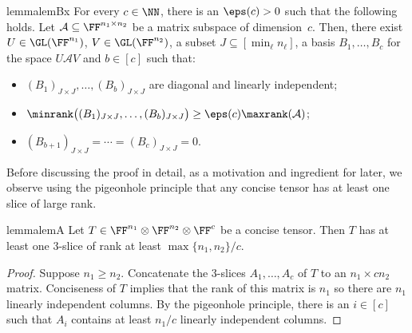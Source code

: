 \begin{restatable}{lemma}{lemBx}
\label{lem:minrk_diag}
\label{claim:matrices-into-diagonal-with-large-rank}
For every $c\in\NN$, there is an $\eps(c)>0$ such that the following holds.
Let $\mathcal A\subseteq \FF^{n_1\times n_2}$ be a matrix subspace of dimension~$c$.
Then, there exist $U\in \GL(\FF^{n_1})$, $V\in \GL(\FF^{n_2})$, a subset $J\subseteq [\min_\ell n_\ell]$, a basis $B_1,\dots,B_c$ for the space $U\mathcal AV$ and $b\in[c]$ such that:
\begin{itemize}
    \item $(B_1)_{J\times J},\dots,(B_b)_{J\times J}$  are diagonal and linearly independent;
    \item $\minrank\big((B_1)_{J\times J}, \ldots, (B_b)_{J\times J}\big) \geq \eps(c) \maxrank(\mathcal{A})$; %
    \item $(B_{b+1})_{J\times J} = \cdots = (B_c)_{J\times J} = 0$.
\end{itemize}
\end{restatable}


Before discussing the proof in detail, as a motivation and ingredient for later, we observe using the pigeonhole principle that any concise tensor has at least one slice of large rank. 

\begin{restatable}{lemma}{lemA}
%
\label{cla:high-rk}
Let $T\in\FF^{n_1}\otimes\FF^{n_2}\otimes\FF^{c}$ be a concise tensor. Then $T$ has at least one 3-slice 
of rank at least $\max\{n_1,n_2\}/c$.    
%
\end{restatable}

\begin{proof}
Suppose $n_1\geq n_2$. %
Concatenate the 3-slices $A_1, \ldots, A_c$ of $T$ to an $n_1\times cn_2$ matrix. Conciseness of $T$ implies that the rank of this matrix is $n_1$ so there are $n_1$ linearly independent columns. By the pigeonhole principle, there is an $i \in [c]$ such that $A_i$ contains at least $n_1/c$ linearly independent columns.   
\end{proof}





